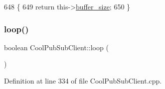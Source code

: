 \begin{DoxyCode}
648                                          \{
649   \textcolor{keywordflow}{return} this->\hyperlink{class_cool_pub_sub_client_ae6cb10e42c057483d53516ac830ab526}{buffer\_size};
650 \}
\end{DoxyCode}
\mbox{\label{class_cool_pub_sub_client_afc15900f0fc4886a19394508e61793b8}} 
\subsubsection{\texorpdfstring{loop()}{loop()}}
{\footnotesize\ttfamily boolean Cool\+Pub\+Sub\+Client\+::loop (\begin{DoxyParamCaption}{ }\end{DoxyParamCaption})}



Definition at line 334 of file Cool\+Pub\+Sub\+Client.\+cpp.


